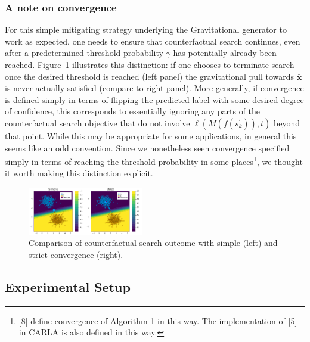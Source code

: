 \documentclass[
  conference]{IEEEtran}
\begin{document}
\hypertarget{a-note-on-convergence}{%
\subsubsection{A note on convergence}\label{a-note-on-convergence}}

For this simple mitigating strategy underlying the Gravitational
generator to work as expected, one needs to ensure that counterfactual
search continues, even after a predetermined threshold probability
\(\gamma\) has potentially already been reached.
Figure~\ref{fig-convergence} illustrates this distinction: if one
chooses to terminate search once the desired threshold is reached (left
panel) the gravitational pull towards \(\bar{\mathbf{x}}\) is never
actually satisfied (compare to right panel). More generally, if
convergence is defined simply in terms of flipping the predicted label
with some desired degree of confidence, this corresponds to essentially
ignoring any parts of the counterfactual search objective that do not
involve \(\ell(M(f(s_k^\prime)),t)\) beyond that point. While this may
be appropriate for some applications, in general this seems like an odd
convention. Since we nonetheless seen convergence specified simply in
terms of reaching the threshold probability in some places\footnote{\protect\hyperlink{ref-joshi2019towards}{{[}8{]}}
  define convergence of Algorithm 1 in this way. The implementation of
  \protect\hyperlink{ref-wachter2017counterfactual}{{[}5{]}} in CARLA is
  also defined in this way.}, we thought it worth making this
distinction explicit.

\begin{figure}

{\centering \includegraphics[width=0.45\textwidth,height=\textheight]{www/gravitational_generator_comparison.png}

}

\caption{\label{fig-convergence}Comparison of counterfactual search
outcome with simple (left) and strict convergence (right).}

\end{figure}

\hypertarget{sec-method-experiment}{%
\subsection{Experimental Setup}\label{sec-method-experiment}}
\end{document}
